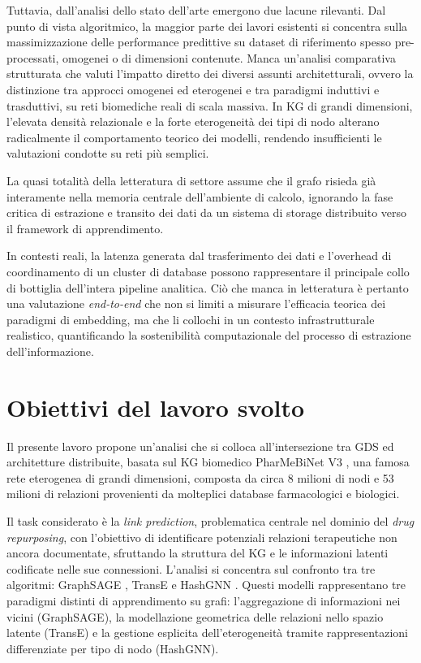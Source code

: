 Tuttavia, dall'analisi dello stato dell'arte emergono due lacune rilevanti. Dal punto di vista algoritmico, la maggior parte dei lavori esistenti si concentra sulla massimizzazione delle performance predittive su dataset di riferimento spesso pre-processati, omogenei o di dimensioni contenute. Manca un'analisi comparativa strutturata che valuti l'impatto diretto dei diversi assunti architetturali, ovvero la distinzione tra approcci omogenei ed eterogenei e tra paradigmi induttivi e trasduttivi, su reti biomediche reali di scala massiva. In KG di grandi dimensioni, l'elevata densità relazionale e la forte eterogeneità dei tipi di nodo alterano radicalmente il comportamento teorico dei modelli, rendendo insufficienti le valutazioni condotte su reti più semplici.

La quasi totalità della letteratura di settore assume che il grafo risieda già interamente nella memoria centrale dell'ambiente di calcolo, ignorando la fase critica di estrazione e transito dei dati da un sistema di storage distribuito verso il framework di apprendimento. 

In contesti reali, la latenza generata dal trasferimento dei dati e l'overhead di coordinamento di un cluster di database possono rappresentare il principale collo di bottiglia dell'intera pipeline analitica. Ciò che manca in letteratura è pertanto una valutazione \textit{end-to-end} che non si limiti a misurare l'efficacia teorica dei paradigmi di embedding, ma che li collochi in un contesto infrastrutturale realistico, quantificando la sostenibilità computazionale del processo di estrazione dell'informazione.

\section{Obiettivi del lavoro svolto}
Il presente lavoro propone un'analisi che si colloca all'intersezione tra GDS ed architetture distribuite, basata sul KG biomedico PharMeBiNet V3 \cite{konigs2022pharmebinet}, una famosa rete eterogenea di grandi dimensioni, composta da circa 8 milioni di nodi e 53 milioni di relazioni provenienti da molteplici database farmacologici e biologici.

Il task considerato è la \textit{link prediction}, problematica centrale nel dominio del \textit{drug repurposing}, con l'obiettivo di identificare potenziali relazioni terapeutiche non ancora documentate, sfruttando la struttura del KG e le informazioni latenti codificate nelle sue connessioni. L'analisi si concentra sul confronto tra tre algoritmi: GraphSAGE \cite{hamilton2017inductive}, TransE \cite{bordes2013translating} e HashGNN \cite{neo4j_hashgnn}. Questi modelli rappresentano tre paradigmi distinti di apprendimento su grafi: l'aggregazione di informazioni nei vicini (GraphSAGE), la modellazione geometrica delle relazioni nello spazio latente (TransE) e la gestione esplicita dell'eterogeneità tramite rappresentazioni differenziate per tipo di nodo (HashGNN).

